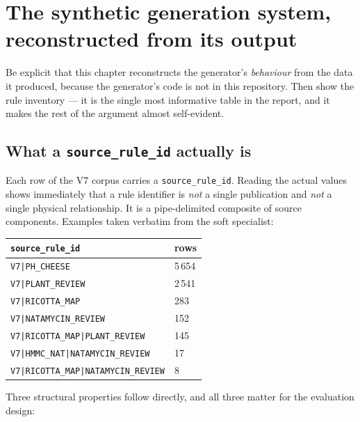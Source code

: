 \chapter{The synthetic generation system, reconstructed from its output}
\label{ch:rules}

\begin{saybox}[title=What to say at the start of this section]
Be explicit that this chapter reconstructs the generator's \emph{behaviour}
from the data it produced, because the generator's code is not in this
repository. Then show the rule inventory --- it is the single most
informative table in the report, and it makes the rest of the argument
almost self-evident.
\end{saybox}

\section{What a \texttt{source\_rule\_id} actually is}

Each row of the V7 corpus carries a \texttt{source\_rule\_id}. Reading the
actual values shows immediately that a rule identifier is \emph{not} a
single publication and \emph{not} a single physical relationship. It is a
pipe-delimited composite of source components. Examples taken verbatim
from the soft specialist:

\begin{center}\small
\begin{tabular}{ll}
\toprule
\texttt{source\_rule\_id} & rows \\
\midrule
\texttt{V7|PH\_CHEESE} & 5\,654 \\
\texttt{V7|PLANT\_REVIEW} & 2\,541 \\
\texttt{V7|RICOTTA\_MAP} & 283 \\
\texttt{V7|NATAMYCIN\_REVIEW} & 152 \\
\texttt{V7|RICOTTA\_MAP|PLANT\_REVIEW} & 145 \\
\texttt{V7|HMMC\_NAT|NATAMYCIN\_REVIEW} & 17 \\
\texttt{V7|RICOTTA\_MAP|NATAMYCIN\_REVIEW} & 8 \\
\bottomrule
\end{tabular}
\end{center}

Three structural properties follow directly, and all three matter for the
evaluation design:

